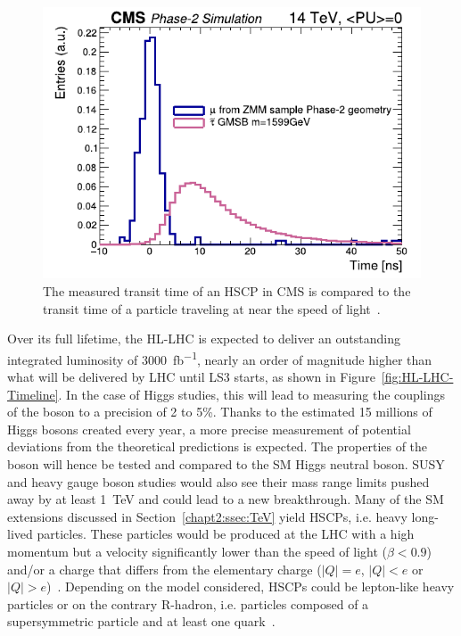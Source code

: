 \begingroup\setlength{\intextsep}{5pt}\setlength{\columnsep}{15pt}
	
	\begin{figure}
		\centering
		\includegraphics[width=\linewidth]{fig/chapt3/HSCP_Time_measurement.pdf}
		\caption{\label{fig:HSCP-Time} The measured transit time of an HSCP in CMS is compared to the transit time of a particle traveling at near the speed of light~\cite{PHASEIITP}.}
	\end{figure}
	
	Over its full lifetime, the HL-LHC is expected to deliver an outstanding integrated luminosity of \SI{3000}{fb^{-1}}, nearly an order of magnitude higher than what will be delivered by LHC until LS3 starts, as shown in Figure~\ref{fig:HL-LHC-Timeline}. In the case of Higgs studies, this will lead to measuring the couplings of the boson to a precision of 2 to 5\%. Thanks to the estimated 15 millions of Higgs bosons created every year, a more precise measurement of potential deviations from the theoretical predictions is expected. The properties of the boson will hence be tested and compared to the SM Higgs neutral boson. SUSY and heavy gauge boson studies would also see their mass range limits pushed away by at least \SI{1}{TeV} and could lead to a new breakthrough. Many of the \acl{SM} extensions discussed in Section~\ref{chapt2:ssec:TeV} yield \acf{HSCPs}, i.e. heavy long-lived particles. These particles would be produced at the LHC with a high momentum but a velocity significantly lower than the speed of light ($\beta < 0.9$)~\cite{DREES1990,FAIRBAIRN2007,LIGETI2010,CMSHSCP2016,KHACHATRYAN2017} and/or a charge that differs from the elementary charge ($\vert Q \vert = e$, $\vert Q \vert < e$ or $\vert Q \vert > e$)~\cite{CMSHSCP2016,KHACHATRYAN2017,KUSENKO1998,KOCH2007,SCHWINGER1966,KHLOPOV2006}. Depending on the model considered, HSCPs could be lepton-like heavy particles or on the contrary R-hadron, i.e. particles composed of a supersymmetric particle and at least one quark~\cite{CMSHSCP2016}.
	
